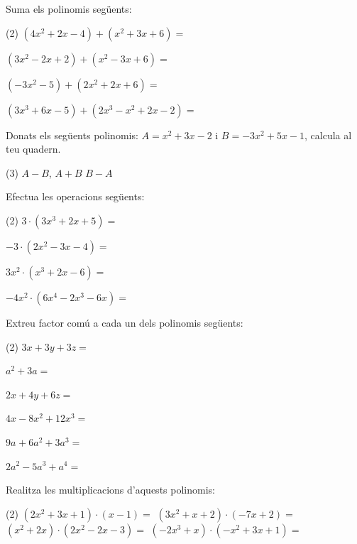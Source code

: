\begin{mylist}
\exer Suma els polinomis següents:
\begin{tasks}(2)
	\task  $\left(4x^{2} +2x-4\right)+\left(x^{2} +3x+6\right)=$  
	                
	\task  $\left(3x^{2} -2x+2\right)+\left(x^{2} -3x+6\right)=$  
	                                                         
	\task  $\left(-3x^{2} -5\right)+\left(2x^{2} +2x+6\right)=$   
	        
	\task $\left(3x^{3} +6x-5\right)+\left(2x^{3} -x^{2} +2x-2\right)=$             
\end{tasks}
\answers[cols=2]{[$5x^2+5x+2$, $4x^2-5x+8$, $-x^2+2x+1$, $5x^3-x^2+8x-7$]}

\exer  Donats els següents polinomis:  $A=x^{2} +3x-2$ i $B=-3x^{2} +5x-1$, calcula al teu  quadern.
\begin{tasks}(3)
	\task  $A-B$,   
	\task  $A+B$   
	\task $B-A$
\end{tasks}
\answers[cols=3]{[$4x^2-2x-1$, $-2x^2+8x-3$, $-4x^2+2x+1$]}

\exer  Efectua les operacions següents:
\begin{tasks}(2)
	\task   $3\cdot \left(3x^{3} +2x+5\right)=$        
	                                
	\task   $-3\cdot \left(2x^{2} -3x-4\right)=$
	
	\task   $3x^{2} \cdot \left(x^{3} +2x-6\right)=$
	
	\task   $-4x^{2} \cdot \left(6x^{4} -2x^{3} -6x\right)=$
\end{tasks}
\answers[cols=2]{[$9x^3+6x+15$, $-6x^2+9x+12$, $3x^5+6x^3-18x^2$, $-24x^6+8x^5+24x^3$]}

\exer  Extreu factor comú a cada un dels polinomis següents: 
\begin{tasks}(2)
	\task  $3x+3y+3z=$
	
	\task  $a^{2} +3a=$
	
	\task  $2x+4y+6z=$
	
	\task  $4x-8x^{2} +12x^{3} =$
	
	\task  $9a^{} +6a^{2} +3a^{3} =$
	
	\task  $2a^{2} -5a^{3} +a^{4} =$
\end{tasks}
\answers[cols=2]{[$3(x+y+z)$, $a(a+3)$, $2(x+2y+3z)$, $4x(1-2x+3x^2)$, $3a(3+2a+a^2)$, $a^2(2-5a+a^2)$]}

\exer  Realitza les multiplicacions d'aquests polinomis:                               
\begin{tasks}(2)
	\task  $\left(2x^{2} +3x+1\right)\cdot \left(x-1\right)=$   
	\task $\left(3x^{2} +x+2\right)\cdot \left(-7x+2\right)=$                                 
	\task  $\left(x^{2} +2x\right)\cdot \left(2x^{2} -2x-3\right)=$     
	\task $\left(-2x^{3} +x\right)\cdot \left(-x^{2} +3x+1\right)=$    	   
\end{tasks}
\answers[cols=1]{[$2x^3+x^2-2x-1$, $-21x^3-x^2-12x+4$, $2x^4+2x^3-7x^2-6x$, $2x^5-6x^4-3x^3+3x^3+x$]}


\end{mylist}
